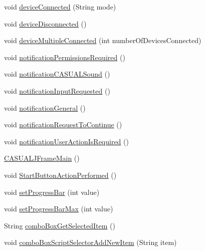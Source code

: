 \begin{DoxyCompactItemize}
\item 
void \hyperlink{classGUI_1_1development_1_1CASUALJFrameMain_aacdbe72ec60c691bc5606c3893a52f7d}{device\-Connected} (String mode)
\item 
void \hyperlink{classGUI_1_1development_1_1CASUALJFrameMain_abd52217ac3134fd45343dd6838601f38}{device\-Disconnected} ()
\item 
void \hyperlink{classGUI_1_1development_1_1CASUALJFrameMain_a0bc8b9c2ca823527932c53d869174e90}{device\-Multiple\-Connected} (int number\-Of\-Devices\-Connected)
\item 
void \hyperlink{classGUI_1_1development_1_1CASUALJFrameMain_a798bd91756d5c27d6f5017a8025b4130}{notification\-Permissions\-Required} ()
\item 
void \hyperlink{classGUI_1_1development_1_1CASUALJFrameMain_a4450abb55d30b94308914af44ef4ee98}{notification\-C\-A\-S\-U\-A\-L\-Sound} ()
\item 
void \hyperlink{classGUI_1_1development_1_1CASUALJFrameMain_a34444561be5204262b95aa6001c4aac1}{notification\-Input\-Requested} ()
\item 
void \hyperlink{classGUI_1_1development_1_1CASUALJFrameMain_a1fe1b03a2ad5aa30c5c8fe208813d4f6}{notification\-General} ()
\item 
void \hyperlink{classGUI_1_1development_1_1CASUALJFrameMain_ad90ba0f96765dfa612ccb92cccecbe98}{notification\-Request\-To\-Continue} ()
\item 
void \hyperlink{classGUI_1_1development_1_1CASUALJFrameMain_a442ecb84833fd7e90fbe97fcb3feb1e7}{notification\-User\-Action\-Is\-Required} ()
\item 
\hyperlink{classGUI_1_1development_1_1CASUALJFrameMain_ac484fbc9062062c993329838cc699127}{C\-A\-S\-U\-A\-L\-J\-Frame\-Main} ()
\item 
void \hyperlink{classGUI_1_1development_1_1CASUALJFrameMain_a019f07e0dcd01688f121d01a6a4f08fb}{Start\-Button\-Action\-Performed} ()
\item 
void \hyperlink{classGUI_1_1development_1_1CASUALJFrameMain_ab5a2bd6f9960330e92ec832a037d8475}{set\-Progress\-Bar} (int value)
\item 
void \hyperlink{classGUI_1_1development_1_1CASUALJFrameMain_aea01e24b1f4fd89b0b362527eb07bc9b}{set\-Progress\-Bar\-Max} (int value)
\item 
String \hyperlink{classGUI_1_1development_1_1CASUALJFrameMain_a65473b796550f93cd0a64fbdc008e321}{combo\-Box\-Get\-Selected\-Item} ()
\item 
void \hyperlink{classGUI_1_1development_1_1CASUALJFrameMain_ad67026cebd68aaa9d5e50a1d772e890b}{combo\-Box\-Script\-Selector\-Add\-New\-Item} (String item)

\end{DoxyCompactItemize}
